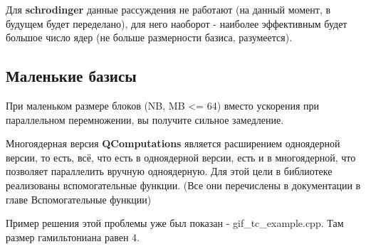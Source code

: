 \documentclass[12pt,fleqn]{article}
\begin{document}
        Для \textbf{schrodinger} данные рассуждения не работают (на данный момент, в будущем будет переделано),
        для него наоборот - наиболее эффективным будет большое число ядер (не больше размерности базиса, разумеется).
        
        \subsection{Маленькие базисы}

        При маленьком размере блоков (NB, MB <= 64) вместо ускорения при параллельном перемножении, вы получите сильное замедление. 

        Многоядерная версия \textbf{QComputations} является расширением одноядерной версии, то есть,
        всё, что есть в одноядерной версии, есть и в многоядерной, что позволяет параллелить вручную одноядерную. Для 
        этой цели в библиотеке реализованы вспомогательные функции. (Все они перечислены в документации в главе \textsf{Вспомогательные функции})

        Пример решения этой проблемы уже был показан - \textsf{gif\_tc\_example.cpp}. Там размер гамильтониана равен 4.
        
\end{document}
